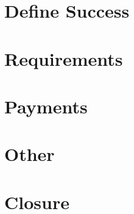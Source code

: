 \documentclass{article}
\begin{document}
  \section{Define Success}
  \section{Requirements}
  \section{Payments}
  \section{Other}
  \section{Closure}
\end{document}
